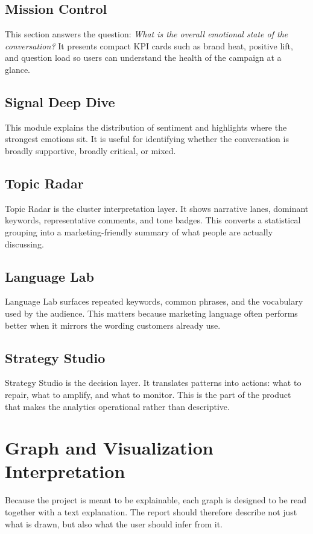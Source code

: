 \subsection{Mission Control}
This section answers the question: \emph{What is the overall emotional state of the conversation?} It presents compact KPI cards such as brand heat, positive lift, and question load so users can understand the health of the campaign at a glance.

\subsection{Signal Deep Dive}
This module explains the distribution of sentiment and highlights where the strongest emotions sit. It is useful for identifying whether the conversation is broadly supportive, broadly critical, or mixed.

\subsection{Topic Radar}
Topic Radar is the cluster interpretation layer. It shows narrative lanes, dominant keywords, representative comments, and tone badges. This converts a statistical grouping into a marketing-friendly summary of what people are actually discussing.

\subsection{Language Lab}
Language Lab surfaces repeated keywords, common phrases, and the vocabulary used by the audience. This matters because marketing language often performs better when it mirrors the wording customers already use.

\subsection{Strategy Studio}
Strategy Studio is the decision layer. It translates patterns into actions: what to repair, what to amplify, and what to monitor. This is the part of the product that makes the analytics operational rather than descriptive.

\section{Graph and Visualization Interpretation}
Because the project is meant to be explainable, each graph is designed to be read together with a text explanation. The report should therefore describe not just what is drawn, but also what the user should infer from it.

